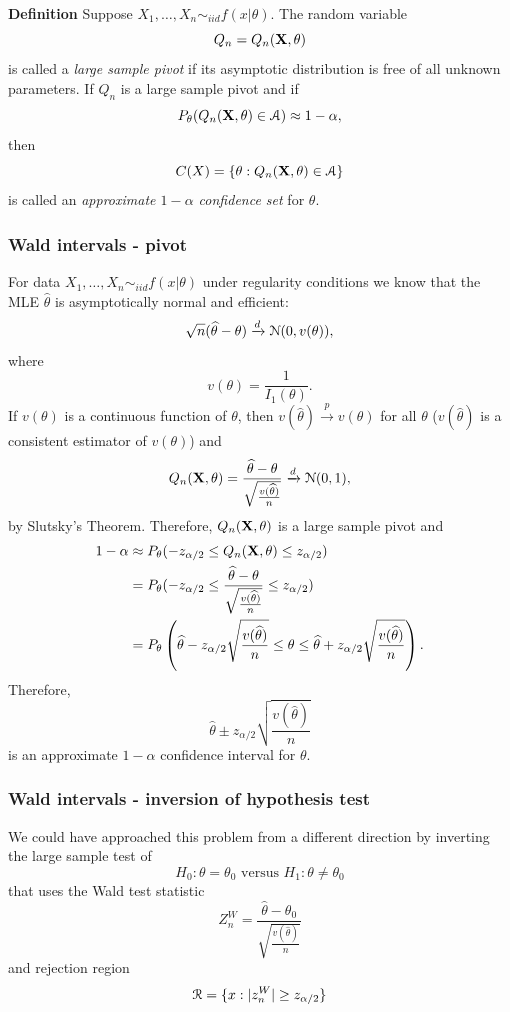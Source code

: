 \documentclass[11pt,]{article}
\newcommand{\Xndots}{X_1, \ldots, X_n}
\def\bX{{\bf X}}
\def\thetahat{{\widehat\theta}}
\def\Asc{{\cal A}}
\def\Nsc{{\cal N}}
\def\Rsc{{\cal R}}
\begin{document}
\noindent\textbf{Definition} Suppose \(\Xndots \sim_{iid} f(x|\theta)\).
The random variable \[Q_n = Q_n(\bX,\theta)\] is called a \emph{large
sample pivot} if its asymptotic distribution is free of all unknown
parameters. If \(Q_n\) is a large sample pivot and if
\[P_\theta(Q_n(\bX,\theta)\in \Asc)\approx 1-\alpha,\] then
\[C(X) = \{ \theta: Q_n(\bX,\theta)\in \Asc\}\] is called an
\emph{approximate \(1-\alpha\) confidence set} for \(\theta\).

\subsubsection{Wald intervals - pivot}

For data \(\Xndots \sim_{iid} f(x|\theta)\) under regularity conditions
we know that the MLE \(\thetahat\) is asymptotically normal and
efficient:
\[\sqrt{n}(\thetahat - \theta) \xrightarrow{d} \Nsc(0,v(\theta)),\]
where \[v(\theta) = \frac{1}{I_1(\theta)}.\] If \(v(\theta)\) is a
continuous function of \(\theta\), then
\(v(\thetahat) \xrightarrow{p} v(\theta)\) for all \(\theta\)
(\(v(\thetahat)\) is a consistent estimator of \(v(\theta)\)) and
\[Q_n(\bX,\theta) = \frac{\thetahat - \theta}{\sqrt{\frac{v(\thetahat)}{n}}} \xrightarrow{d} \Nsc(0,1),\]
by Slutsky's Theorem. Therefore, \(Q_n(\bX,\theta)\) is a large sample
pivot and \begin{align*}
1-\alpha &\approx P_\theta(-z_{\alpha/2} \leq Q_n(\bX, \theta) \leq z_{\alpha/2})\\
&= P_\theta(-z_{\alpha/2} \leq \frac{\thetahat - \theta}{\sqrt{\frac{v(\thetahat)}{n}}} \leq z_{\alpha/2})\\
&= P_\theta\left(\thetahat - z_{\alpha/2}\sqrt{\frac{v(\thetahat)}{n}} \leq \theta \leq \thetahat + z_{\alpha/2}\sqrt{\frac{v(\thetahat)}{n}}\right).
\end{align*} Therefore,
\[\thetahat \pm z_{\alpha/2}\sqrt{\frac{v(\thetahat)}{n}}\] is an
approximate \(1-\alpha\) confidence interval for \(\theta\).

\subsubsection{Wald intervals - inversion of hypothesis test}

We could have approached this problem from a different direction by
inverting the large sample test of
\[H_0: \theta = \theta_0 \mbox{ versus } H_1: \theta \neq \theta_0\]
that uses the Wald test statistic
\[Z_n^W = \frac{\thetahat - \theta_0}{\sqrt{\frac{v(\thetahat)}{n}}}\]
and rejection region \[\Rsc = \{x: |z_n^W| \geq z_{\alpha/2}\}\]
\end{document}
